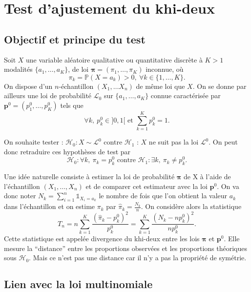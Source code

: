 \documentclass[
]{book}
\theoremstyle{definition}
\theoremstyle{definition}
\theoremstyle{definition}
\theoremstyle{definition}
\theoremstyle{remark}
\begin{document}
\hypertarget{test-dajustement-du-khi-deux}{%
\section{Test d'ajustement du khi-deux}\label{test-dajustement-du-khi-deux}}

\hypertarget{objectif-et-principe-du-test}{%
\subsection{Objectif et principe du test}\label{objectif-et-principe-du-test}}

Soit \(X\) une variable aléatoire qualitative ou quantitative discrète à \(K>1\) modalités \(\{a_1,\ldots,a_K\}\), de loi
\(\boldsymbol{\pi}=(\pi_1,\ldots,\pi_K)\) inconnue, où
\[
\pi_k = \mathbb{P}(X=a_k)>0,\ \forall k\in\{1,\ldots,K\}.
\]
On dispose d'un \(n\)-échantillon \((X_1, \ldots X_n)\) de même loi que \(X\). On se donne par ailleurs une loi de probabilité \(\mathcal L_0\) sur \(\{a_1,\ldots,a_K\}\) connue caractérisée par \(\mathbf{p}^0=(p_1^0,\ldots,p_K^0)\) tels que
\[
\forall k,\ p_k^0\in]0,1[ \textrm{ et } \sum_{k=1}^K p_k^0 =1.
\]

On souhaite tester : \(\mathcal{H}_0 : X \sim \mathcal L^0\) contre \(\mathcal{H}_1\) : \(X\) ne suit pas la loi \(\mathcal L^0\).
On peut donc retraduire ces hypothèses de test par
\[
\mathcal{H}_0 : \forall k,\ \pi_k = p_k^0 \textrm{ contre } \mathcal{H}_1 : \exists k,\ \pi_k \neq p_k^0.
\]

Une idée naturelle consiste à estimer la loi de probabilité \(\boldsymbol{\pi}\) de X à l'aide de l'échantillon \((X_1,\ldots,X_n)\) et de comparer cet estimateur avec la loi \(\mathbf{p}^0\). On va donc noter \(N_k= \sum_{i=1}^n \mathbb{1}_{X_i = a_k}\) le nombre de fois que l'on obtient la valeur \(a_k\) dans l'échantillon et on estime \(\pi_k\) par \(\hat{\pi}_k = \frac{N_k}{n}\). On considère alors la statistique
\[
T_{n}= n \sum_{k=1}^K \frac{\left(\hat{\pi}_k - p_k^0\right)^2}{p_k^0} = \sum_{k=1}^K \frac{\left(N_k - n p_k^0\right)^2}{n p_k^0}.
\]
Cette statistique est appelée divergence du khi-deux entre les lois \(\hat{\boldsymbol{\pi}}\) et \(\mathbf{p}^0\). Elle mesure la ``distance'' entre les proportions observées et les proportions théoriques sous \(\mathcal{H}_0\). Mais ce n'est pas une distance car il n'y a pas la propriété de symétrie.

\hypertarget{lien-avec-la-loi-multinomiale}{%
\subsection{Lien avec la loi multinomiale}\label{lien-avec-la-loi-multinomiale}}
\end{document}
